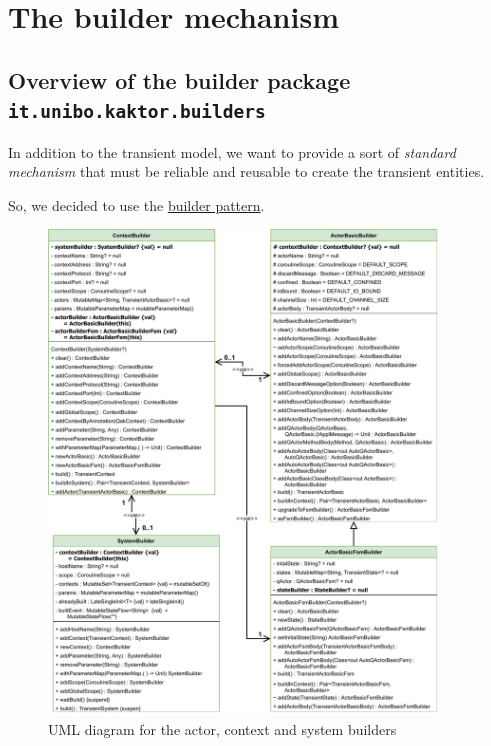 \section{The builder mechanism}

\subsection{Overview of the builder package \texttt{it.unibo.kaktor.builders}}

In addition to the transient model, we want to provide a sort of \textit{standard mechanism} that must be reliable and reusable to create the transient entities.

So, we decided to use the \href{https://en.wikipedia.org/wiki/Builder_pattern}{builder pattern}.

\begin{figure}[h!]
	\centering
	\includegraphics[width=0.92\textwidth]{img/[UML]it.unibo.kaktor.builders_actorb_contextb_systemb}
	\caption{UML diagram for the actor, context and system builders}
	\label{fig::builders_actorb_contextb_systemb}
\end{figure}

